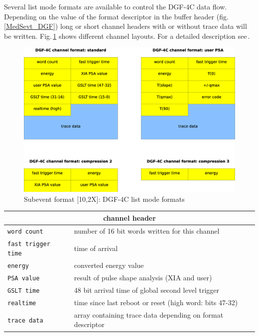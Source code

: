 \documentclass[10pt,a4paper]{article}
\begin{document}
\newpage
Several list mode formats are available to control the DGF-4C data flow. Depending on the value of the format descriptor in
the buffer header (fig.\,\ref{MedSevt_DGF}) long or short channel headers with or without trace data will be written.
Fig.\,\ref{MedSevt_DGF_ChannelFormats} shows different channel layouts.
For a detailed description see\,\cite{XIAManuals}.
\begin{figure}[H]
\centerline{\includegraphics[width=\linewidth]{MedSevt_DGF_ChannelFormats}}
\caption{Subevent format [10,2X]: DGF-4C list mode formats}
\label{MedSevt_DGF_ChannelFormats}
\end{figure}
\begin{minipage}{\linewidth}
\begin{table}[H]
\begin{center}
\begin{tabular}{ll}
\hline
\multicolumn{2}{c}{channel header} \\
\hline
\verb+word count+ & number of 16 bit words written for this channel \\
\verb+fast trigger time+ & time of arrival \\
\verb+energy+ & converted energy value \\
\verb+PSA value+ & result of pulse shape analysis (XIA and user) \\
\verb+GSLT time+ & 48 bit arrival time of global second level trigger \\
\verb+realtime+ & time since last reboot or reset (high word: bits 47-32) \\
\verb+trace data+ & array containing trace data depending on format descriptor \\
\hline
\end{tabular}
\end{center}
\label{MedSevt_DGF_ChannelFormats_Legend}
\end{table}
\end{minipage}
\newpage
\end{document}
